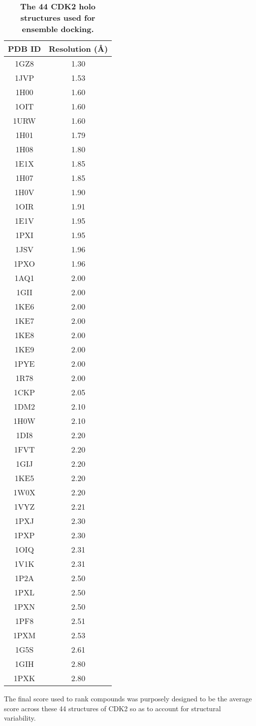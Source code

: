 \documentclass[10pt,letterpaper]{article}
\begin{document}
\begin{table}
\caption{
\bf{The 44 CDK2 holo structures used for ensemble docking.}}
\begin{tabular}{cc}
\hline
PDB ID & Resolution (\AA)\\
\hline
1GZ8 & 1.30\\
1JVP & 1.53\\
1H00 & 1.60\\
1OIT & 1.60\\
1URW & 1.60\\
1H01 & 1.79\\
1H08 & 1.80\\
1E1X & 1.85\\
1H07 & 1.85\\
1H0V & 1.90\\
1OIR & 1.91\\
1E1V & 1.95\\
1PXI & 1.95\\
1JSV & 1.96\\
1PXO & 1.96\\
1AQ1 & 2.00\\
1GII & 2.00\\
1KE6 & 2.00\\
1KE7 & 2.00\\
1KE8 & 2.00\\
1KE9 & 2.00\\
1PYE & 2.00\\
1R78 & 2.00\\
1CKP & 2.05\\
1DM2 & 2.10\\
1H0W & 2.10\\
1DI8 & 2.20\\
1FVT & 2.20\\
1GIJ & 2.20\\
1KE5 & 2.20\\
1W0X & 2.20\\
1VYZ & 2.21\\
1PXJ & 2.30\\
1PXP & 2.30\\
1OIQ & 2.31\\
1V1K & 2.31\\
1P2A & 2.50\\
1PXL & 2.50\\
1PXN & 2.50\\
1PF8 & 2.51\\
1PXM & 2.53\\
1G5S & 2.61\\
1GIH & 2.80\\
1PXK & 2.80\\
\hline
\end{tabular}
\begin{flushleft} The final score used to rank compounds was purposely designed to be the average score across these 44 structures of CDK2 so as to account for structural variability.
\end{flushleft}
\label{PDBs}
\end{table}
\end{document}
